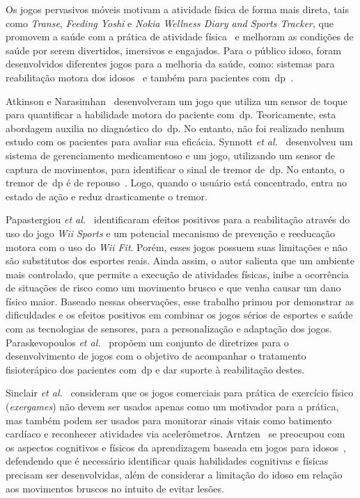Os jogos pervasivos móveis motivam a atividade física de forma mais direta, tais como \textit{Transe}, \textit{Feeding Yoshi} e  \textit{Nokia Wellness Diary and Sports Tracker}, que promovem a saúde com a prática de atividade física~\cite{Suhonen:2008:SFE:1457199.1457204} e melhoram as condições de saúde por serem divertidos, imersivos e engajados. Para o público idoso, foram desenvolvidos diferentes jogos para a melhoria da saúde, como: sistemas para reabilitação motora dos idosos~\cite{brox11} e também para pacientes com~\ac{dp}~\cite{atkinson2010,synnott_wiipd_2012,sacbespoke2014}. 

Atkinson e Narasimhan~\cite{atkinson2010} desenvolveram um jogo que utiliza um sensor de toque para quantificar a habilidade motora do paciente com~\ac{dp}. Teoricamente, esta abordagem auxilia no diagnóstico do~\ac{dp}. No entanto, não foi realizado nenhum estudo com os pacientes para avaliar sua eficácia. Synnott \textit{et al.}~\cite{synnott_wiipd_2012} desenvolveu um sistema de gerenciamento medicamentoso e um jogo, utilizando um sensor de captura de movimentos, para identificar o sinal de tremor de~\ac{dp}. No entanto, o tremor de~\ac{dp} é de repouso~\cite{national2006parkinson}. Logo, quando o usuário está concentrado, entra no estado de ação e reduz drasticamente o tremor.

Papastergiou \textit{et al.}~\cite{Papastergiou:2009:EPC:1570538.1570707} identificaram efeitos positivos para a reabilitação através do uso do jogo \textit{Wii Sports} e um potencial mecanismo de prevenção e reeducação motora com o uso do \textit{Wii Fit}. Porém, esses jogos possuem suas limitações e não são substitutos dos esportes reais. Ainda assim, o autor salienta que um ambiente mais controlado, que permite a execução de atividades físicas, inibe a ocorrência de situações de risco como um movimento brusco e que venha causar um dano físico maior. Baseado nessas observações, esse trabalho primou por demonstrar as dificuldades e os efeitos positivos em combinar os jogos sérios de esportes e saúde com as tecnologias de sensores, para a personalização e adaptação dos jogos. Paraskevopoulos \textit{et al.}~\cite{sacbespoke2014} propõem um conjunto de diretrizes para o desenvolvimento de jogos com o objetivo de acompanhar o tratamento fisioterápico dos pacientes com~\ac{dp} e dar suporte à reabilitação destes.

Sinclair \textit{et al.}~\cite{Sinclair:2009:UVB:1515604.1515617} consideram que os jogos comerciais para prática de exercício físico (\textit{exergames}) não devem ser usados apenas como um motivador para a prática, mas também podem ser usados para monitorar sinais vitais como batimento cardíaco e reconhecer atividades via acelerômetros. Arntzen~\cite{arntzen2011} se preocupou com os aspectos cognitivos e físicos da aprendizagem baseada em jogos para idosos~\cite{arntzen2011}, defendendo que é necessário identificar quais habilidades cognitivas e físicas precisam ser desenvolvidas, além de considerar a limitação do idoso em relação aos movimentos bruscos no intuito de evitar lesões.

